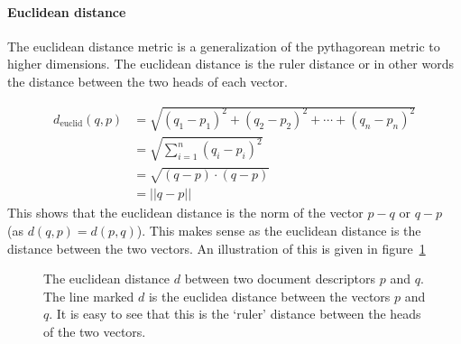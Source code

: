 \paragraph{Euclidean distance}
The euclidean distance metric is a generalization of the pythagorean metric to
higher dimensions. The euclidean distance is the ruler distance or in other 
words the distance between the two heads of each vector.

\begin{align*}
  d_{\text{euclid}}(q,p) &= \sqrt{(q_1 - p_1)^2 + (q_2 - p_2)^2 + \cdots + (q_n - p_n)^2}  \\
                         &= \sqrt{\sum_{i=1}^n (q_i - p_i)^2} \\
                         &= \sqrt {(q-p) \cdot (q-p)} \\
                         &= || q - p ||
\end{align*}
This shows that the euclidean distance is the norm of the vector $p-q$ or 
$q-p$ (as $d(q,p) = d(p,q)$). This makes sense as the euclidean distance
is the distance between the two vectors. An illustration of this is given in
figure~\ref{fig:euclid}

\begin{figure}[h!]
 \center

 \caption{The euclidean distance $d$ between two document descriptors $p$ and $q$. The line marked $d$ is the euclidea distance between the vectors $p$ and $q$. It is easy to see that this is the `ruler' distance between the heads of the two vectors.}
 \label{fig:euclid}
\end{figure}

